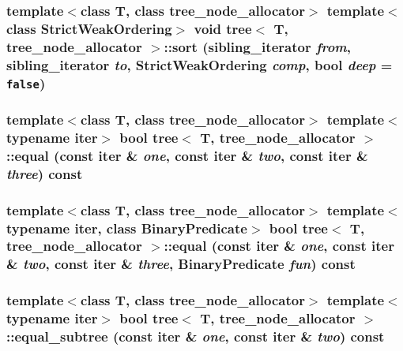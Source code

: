 \hypertarget{classtree_f187f42c28a39304649ee41d3464f2ef}{
\subsubsection{\setlength{\rightskip}{0pt plus 5cm}template$<$class T, class tree\_\-node\_\-allocator$>$ template$<$class StrictWeakOrdering$>$ void {\bf tree}$<$ T, tree\_\-node\_\-allocator $>$::sort ({\bf sibling\_\-iterator} {\em from}, \/  {\bf sibling\_\-iterator} {\em to}, \/  StrictWeakOrdering {\em comp}, \/  bool {\em deep} = {\tt false})}}
\label{classtree_f187f42c28a39304649ee41d3464f2ef}


\hypertarget{classtree_59488f63fc6ad997809d971c48ecfc04}{
\subsubsection{\setlength{\rightskip}{0pt plus 5cm}template$<$class T, class tree\_\-node\_\-allocator$>$ template$<$typename iter$>$ bool {\bf tree}$<$ T, tree\_\-node\_\-allocator $>$::equal (const iter \& {\em one}, \/  const iter \& {\em two}, \/  const iter \& {\em three}) const}}
\label{classtree_59488f63fc6ad997809d971c48ecfc04}


\hypertarget{classtree_7ce7ff12a68be494b28925b2f7184a29}{
\subsubsection{\setlength{\rightskip}{0pt plus 5cm}template$<$class T, class tree\_\-node\_\-allocator$>$ template$<$typename iter, class BinaryPredicate$>$ bool {\bf tree}$<$ T, tree\_\-node\_\-allocator $>$::equal (const iter \& {\em one}, \/  const iter \& {\em two}, \/  const iter \& {\em three}, \/  BinaryPredicate {\em fun}) const}}
\label{classtree_7ce7ff12a68be494b28925b2f7184a29}


\hypertarget{classtree_6e2e76dfa6f0f51ca6f573d73b0c1b28}{
\subsubsection{\setlength{\rightskip}{0pt plus 5cm}template$<$class T, class tree\_\-node\_\-allocator$>$ template$<$typename iter$>$ bool {\bf tree}$<$ T, tree\_\-node\_\-allocator $>$::equal\_\-subtree (const iter \& {\em one}, \/  const iter \& {\em two}) const}}
\label{classtree_6e2e76dfa6f0f51ca6f573d73b0c1b28}


